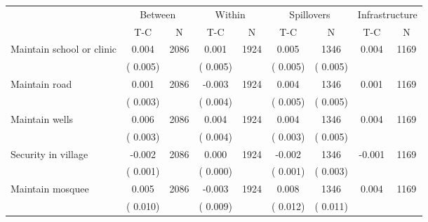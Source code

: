 
\begin{tabular}{l*{8}{c}}\hline&\multicolumn{2}{c}{Between}&\multicolumn{2}{c}{Within}&\multicolumn{2}{c}{Spillovers}&\multicolumn{2}{c}{Infrastructure}\\ \cmidrule(r){2-3}\cmidrule(l){4-5}\cmidrule(l){6-7}\cmidrule(l){8-9} & {T-C} & {N} & {T-C} & {N}  & {T-C}  & {N} & {T-C}  & {N} \\ \midrule
Maintain school or clinic        &              0.004      &       2086       &              0.001      &       1924       &              0.005      &       1346  &        0.004 &       1169       \\
                       &       (       0.005)            &                               &       (       0.005)            &                               &       (       0.005)            &       (       0.005) &                  \\
Maintain road        &              0.001      &       2086       &             -0.003      &       1924       &              0.004      &       1346  &        0.001 &       1169       \\
                       &       (       0.003)            &                               &       (       0.004)            &                               &       (       0.005)            &       (       0.005) &                  \\
Maintain wells        &              0.006      &       2086       &              0.004      &       1924       &              0.004      &       1346  &        0.004 &       1169       \\
                       &       (       0.003)            &                               &       (       0.004)            &                               &       (       0.003)            &       (       0.005) &                  \\
Security in village        &             -0.002      &       2086       &              0.000      &       1924       &             -0.002      &       1346  &       -0.001 &       1169       \\
                       &       (       0.001)            &                               &       (       0.000)            &                               &       (       0.001)            &       (       0.003) &                  \\
Maintain mosquee        &              0.005      &       2086       &             -0.003      &       1924       &              0.008      &       1346  &        0.004 &       1169       \\
                       &       (       0.010)            &                               &       (       0.009)            &                               &       (       0.012)            &       (       0.011) &                  \\
\hline \end{tabular}